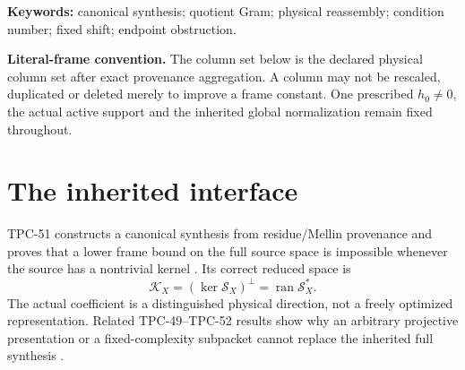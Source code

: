 \documentclass[11pt]{article}
\theoremstyle{definition}
\theoremstyle{remark}
\newcommand{\Lzero}{\mathrm{L0}}
\newcommand{\Lone}{\mathrm{L1}}
\newcommand{\Ltwo}{\mathrm{L2}}
\newcommand{\Syn}{\mathcal S}
\begin{document}
\begin{abstract}
We also prove a sharp two-column subframe obstruction without
rescaling the physical columns.  If their norms are
\(\alpha,\beta>0\) and their normalized coherence is \(\rho\), the
two-column Gram has exact eigenvalues
\[
 \lambda_\pm=\frac{\alpha^2+\beta^2\pm
 \sqrt{(\alpha^2-\beta^2)^2+4\alpha^2\beta^2\rho^2}}2,
\]
and hence
\[
 \kappa_{{\rm q},{\rm pair}}^2=\frac{\lambda_+}{\lambda_-}
 \ge\frac{1+\rho}{1-\rho}.
\]
Equality in the lower bound occurs for equal column norms.
This obstruction transfers to the complete frame only when the pair
is a reducing block, or when a full-Gram Rayleigh certificate proves
the same costly direction.  Under that explicit inheritance
condition, \(1-\rho\le X^{-2\chi+o(1)}\) forces the uniform quotient
envelope to be at least \(X^{\chi+o(1)}\).  This alone does not stop
the strict physical endpoint: a stop additionally requires a lower
bound for the actual unavoidable H9 composite or a proof that it
aligns the extremal singular directions.  The
theorem is exact \(\Lzero\) frame algebra with a conditional
\(\Lone\) bridge.  We do not estimate the smallest
positive Gram eigenvalue for the growing TPC carrier, obtain an
\(\Ltwo\) fixed-shift saving, or claim a parity or twin-prime
breakthrough.
\end{abstract}

\noindent\textbf{Keywords:}
canonical synthesis; quotient Gram; physical reassembly; condition
number; fixed shift; endpoint obstruction.

\medskip
\noindent\textbf{Literal-frame convention.}
The column set below is the declared physical column set after exact
provenance aggregation.  A column may not be rescaled, duplicated or
deleted merely to improve a frame constant.  One prescribed
\(h_0\ne0\), the actual active support and the inherited global
normalization remain fixed throughout.

\section{The inherited interface}

TPC-51 constructs a canonical synthesis from residue/Mellin
provenance and proves that a lower frame bound on the full source
space is impossible whenever the source has a nontrivial kernel
\citep{WangTPC51}.  Its correct reduced space is
\[
 \mathcal K_X=(\ker\Syn_X)^\perp
 =\operatorname{ran}\Syn_X^*.
\]
The actual coefficient is a distinguished physical direction, not a
freely optimized representation.  Related TPC-49--TPC-52 results
show why an arbitrary projective presentation or a fixed-complexity
subpacket cannot replace the inherited full synthesis
\citep{WangTPC49,WangTPC52}.
\end{document}
